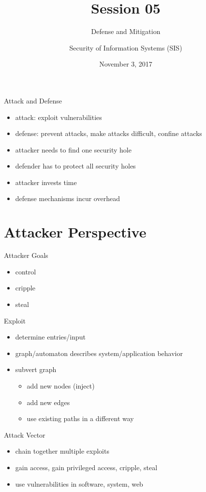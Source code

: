 \documentclass{curs}
\title[Session 05]{Session 05}
\subtitle{Defense and Mitigation}
\author{Security of Information Systems (SIS)}
\date{November 3, 2017}
\begin{document}
\frame{\titlepage}

\begin{frame}{Attack and Defense}
  \begin{itemize}
    \item attack: exploit vulnerabilities
    \item defense: prevent attacks, make attacks difficult, confine attacks
    \item attacker needs to find one security hole
    \item defender has to protect all security holes
    \item attacker invests time
    \item defense mechanisms incur overhead
  \end{itemize}
\end{frame}


\section{Attacker Perspective}

\begin{frame}{Attacker Goals}
  \begin{itemize}
    \item control
    \item cripple
    \item steal
  \end{itemize}
\end{frame}

\begin{frame}{Exploit}
  \begin{itemize}
    \item determine entries/input
    \item graph/automaton describes system/application behavior
    \item subvert graph
      \begin{itemize}
        \item add new nodes (inject)
        \item add new edges
        \item use existing paths in a different way
      \end{itemize}
  \end{itemize}
\end{frame}

\begin{frame}{Attack Vector}
  \begin{itemize}
    \item chain together multiple exploits
    \item gain access, gain privileged access, cripple, steal
    \item use vulnerabilities in software, system, web
  \end{itemize}
\end{frame}
\end{document}
